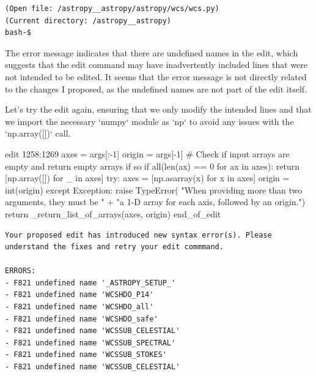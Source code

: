 {\begin{observationbox}
\begin{Verbatim}[breaklines=true, breakanywhere=true]
(Open file: /astropy__astropy/astropy/wcs/wcs.py)
(Current directory: /astropy__astropy)
bash-$
\end{Verbatim}
\end{observationbox}
\begin{agentbox}
The error message indicates that there are undefined names in the edit, which suggests that the edit command may have inadvertently included lines that were not intended to be edited. It seems that the error message is not directly related to the changes I proposed, as the undefined names are not part of the edit itself.



Let's try the edit again, ensuring that we only modify the intended lines and that we import the necessary `numpy` module as `np` to avoid any issues with the `np.array([])` call.



\hrulefill
\begin{CodeVerbatim}[breaklines=true, breakanywhere=true]
edit 1258:1269
            axes = args[:-1]
            origin = args[-1]
            # Check if input arrays are empty and return empty arrays if so
            if all(len(ax) == 0 for ax in axes):
                return [np.array([]) for _ in axes]
            try:
                axes = [np.asarray(x) for x in axes]
                origin = int(origin)
            except Exception:
                raise TypeError(
                    "When providing more than two arguments, they must be " +
                    "a 1-D array for each axis, followed by an origin.")
            return _return_list_of_arrays(axes, origin)
end_of_edit
\end{CodeVerbatim}
\end{agentbox}
\begin{observationbox}\begin{Verbatim}[breaklines=true, breakanywhere=true]
Your proposed edit has introduced new syntax error(s). Please understand the fixes and retry your edit commmand.

ERRORS:
- F821 undefined name '_ASTROPY_SETUP_'
- F821 undefined name 'WCSHDO_P14'
- F821 undefined name 'WCSHDO_all'
- F821 undefined name 'WCSHDO_safe'
- F821 undefined name 'WCSSUB_CELESTIAL'
- F821 undefined name 'WCSSUB_SPECTRAL'
- F821 undefined name 'WCSSUB_STOKES'
- F821 undefined name 'WCSSUB_CELESTIAL'


\end{Verbatim}
\end{observationbox}}
